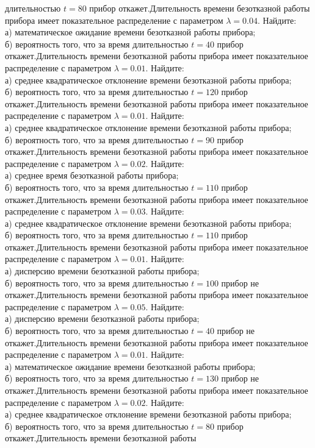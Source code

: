 длительностью $t = 80$ прибор откажет.Длительность времени безотказной работы прибора имеет показательное распределение с параметром $\lambda = 0.04$. Найдите: \\ \quad а) математическое ожидание времени безотказной работы прибора; \\ \quad б) вероятность того, что за время длительностью $t = 40$ прибор откажет.Длительность времени безотказной работы прибора имеет показательное распределение с параметром $\lambda = 0.01$. Найдите: \\ \quad а) среднее квадратическое отклонение времени безотказной работы прибора; \\ \quad б) вероятность того, что за время длительностью $t = 120$ прибор откажет.Длительность времени безотказной работы прибора имеет показательное распределение с параметром $\lambda = 0.01$. Найдите: \\ \quad а) среднее квадратическое отклонение времени безотказной работы прибора; \\ \quad б) вероятность того, что за время длительностью $t = 90$ прибор откажет.Длительность времени безотказной работы прибора имеет показательное распределение с параметром $\lambda = 0.02$. Найдите: \\ \quad а) среднее время безотказной работы прибора; \\ \quad б) вероятность того, что за время длительностью $t = 110$ прибор откажет.Длительность времени безотказной работы прибора имеет показательное распределение с параметром $\lambda = 0.03$. Найдите: \\ \quad а) среднее квадратическое отклонение времени безотказной работы прибора; \\ \quad б) вероятность того, что за время длительностью $t = 110$ прибор откажет.Длительность времени безотказной работы прибора имеет показательное распределение с параметром $\lambda = 0.01$. Найдите: \\ \quad а) дисперсию времени безотказной работы прибора; \\ \quad б) вероятность того, что за время длительностью $t = 100$ прибор не откажет.Длительность времени безотказной работы прибора имеет показательное распределение с параметром $\lambda = 0.05$. Найдите: \\ \quad а) дисперсию времени безотказной работы прибора; \\ \quad б) вероятность того, что за время длительностью $t = 40$ прибор не откажет.Длительность времени безотказной работы прибора имеет показательное распределение с параметром $\lambda = 0.01$. Найдите: \\ \quad а) математическое ожидание времени безотказной работы прибора; \\ \quad б) вероятность того, что за время длительностью $t = 130$ прибор не откажет.Длительность времени безотказной работы прибора имеет показательное распределение с параметром $\lambda = 0.02$. Найдите: \\ \quad а) среднее квадратическое отклонение времени безотказной работы прибора; \\ \quad б) вероятность того, что за время длительностью $t = 80$ прибор откажет.Длительность времени безотказной работы 